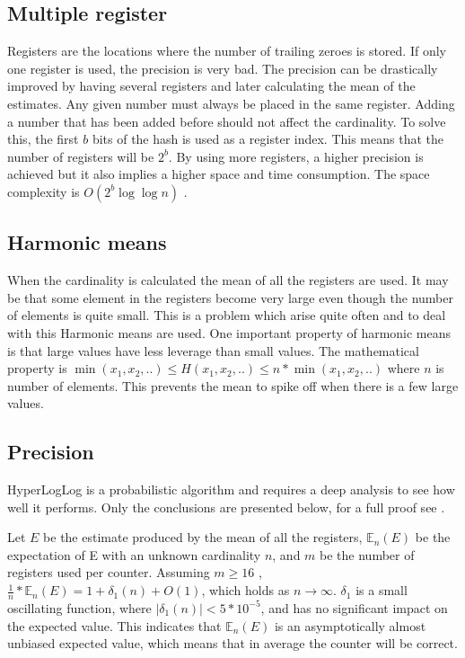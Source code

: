 \subsection{Multiple register}
Registers are the locations where the number of trailing zeroes is stored. If only one register is used, the precision is very bad. The precision can be drastically improved by having several registers and later calculating the mean of the estimates. Any given number must always be placed in the same register. Adding a number that has been added before should not affect the cardinality. To solve this, the first $b$ bits of the hash is used as a register index. This means that the number of registers will be $2^b$. By using more registers, a higher precision is achieved but it also implies a higher space and time consumption. The space complexity is $O(2^b\log\log n)$ \cite{hyperloglog}. 

\subsection{Harmonic means}
When the cardinality is calculated the mean of all the registers are used. It may be that some element in the registers become very large even though the number of elements is quite small. This is a problem which arise quite often and to deal with this Harmonic means are used. One important property of harmonic means is that large values have less leverage than small values. The mathematical property is $\min(x_1,x_2,..) \leq H(x_1,x_2,..) \leq n*\min(x_1,x_2,..)$ where $n$ is number of elements. This prevents the mean to spike off when there is a few large values.  

\subsection{Precision}
HyperLogLog is a probabilistic algorithm and requires a deep analysis to see how well it performs. Only the conclusions are presented below, for a full proof see \cite{hyperloglog}. 

Let $E$ be the estimate produced by the mean of all the registers, $\mathbb{E}_n(E)$ be the expectation of E with an unknown cardinality $n$, and $m$ be the number of registers used per counter. Assuming $m \geq 16$ , $\frac{1}{n}*\mathbb{E}_n(E) = 1 + \delta_1(n) + O(1)$, which holds as $n \rightarrow \infty$. $\delta_1$ is a small oscillating function, where $|\delta_1(n)| < 5*10^{-5}$, and has no significant impact on the expected value. This indicates that $\mathbb{E}_n(E)$ is an asymptotically almost unbiased expected value, which means that in average the counter will be correct. 

